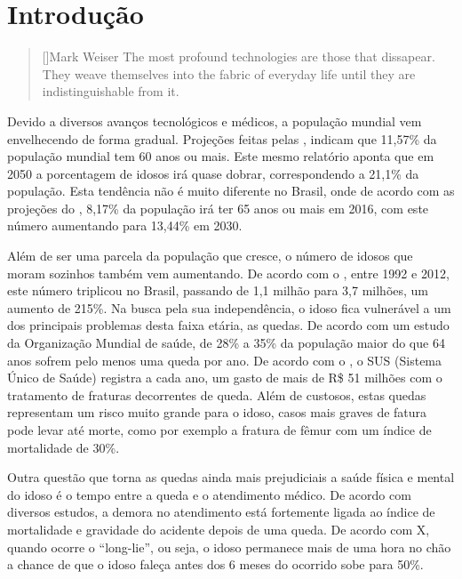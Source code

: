 \chapter{Introdução}
\label{cap:introducao}

\begin{quotation}[]{Mark Weiser}
The most profound technologies are those that dissapear. They weave themselves into the fabric of everyday life until they are indistinguishable from it.



\end{quotation}

Devido a diversos avanços tecnológicos e médicos, a população mundial vem envelhecendo de forma gradual. Projeções feitas pelas \cite{unPopulation:13}, indicam que 11,57\% da população mundial tem 60 anos ou mais. Este mesmo relatório aponta que em 2050 a porcentagem de idosos irá quase dobrar, correspondendo a 21,1\% da população. Esta tendência não é muito diferente no Brasil, onde de acordo com as projeções do \cite{ibgePopulation:16}, 8,17\% da população irá ter 65 anos ou mais em 2016, com este número aumentando para 13,44\% em 2030.

Além de ser uma parcela da população que cresce, o número de idosos que moram sozinhos também vem aumentando. De acordo com o \cite{PNAD:12}, entre 1992 e 2012,  este número triplicou no Brasil, passando de 1,1 milhão para 3,7 milhões, um aumento de 215\%. Na busca pela sua independência, o idoso fica vulnerável a um dos principais problemas desta faixa etária, as quedas. De acordo com um estudo da Organização Mundial de saúde,  de 28\% a 35\% da população maior do que 64 anos sofrem pelo menos uma queda por ano. De acordo com o \cite{portalBrasilQuedas:12}, o SUS (Sistema Único de Saúde) registra a cada ano, um gasto de mais de R\$ 51 milhões com o tratamento de fraturas decorrentes de queda. Além de custosos, estas quedas representam um risco muito grande para o idoso, casos mais graves de fatura pode levar até morte, como por exemplo a fratura de fêmur com um índice de mortalidade de 30\%.

Outra questão que torna as quedas ainda mais prejudiciais a saúde física e mental do idoso é o tempo entre a queda e o  atendimento médico. De acordo com diversos estudos, a demora no atendimento está fortemente ligada ao índice de mortalidade e gravidade do acidente depois de uma queda. De acordo com X, quando ocorre o “long-lie”, ou seja, o idoso permanece mais de uma hora no chão a chance de que o idoso faleça antes dos 6 meses do ocorrido sobe para 50\%.

